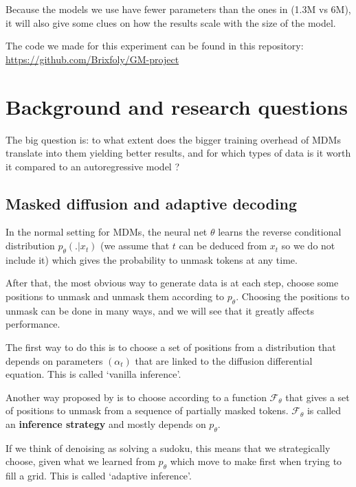 \documentclass{article}
\begin{document}
Because the models we use have fewer parameters than the ones in \citet{kim2025trainworstplanbest} (1.3M vs 6M),
it will also give some clues on how the results scale with the size of the model.

The code we made for this experiment can be found in this repository:\\
\url{https://github.com/Brixfoly/GM-project}

\section{Background and research questions}
The big question is: 
to what extent does the bigger training overhead of MDMs
translate into them yielding better results, and for which types of data is it worth it compared to an autoregressive model ?

\subsection{Masked diffusion and adaptive decoding}
In the normal setting for MDMs, the neural net $\theta$ learns the reverse conditional distribution $p_\theta(.|x_t)$ (we assume that $t$ can be deduced from $x_t$ so we do not include it) which gives the probability to unmask tokens at any time.

After that, the most obvious way to generate data is at each step, choose some positions to unmask and unmask them according to $p_\theta$. Choosing the positions to unmask can be done in many ways, and we will see that it greatly affects performance.

The first way to do this is to choose a set of positions from a distribution that depends on parameters $(\alpha_t)$ that are linked to the diffusion differential equation. This is called `vanilla inference'.

Another way proposed by \citet{kim2025trainworstplanbest} is to choose according to a function $\mathcal{F}_\theta$ that gives a set of positions to unmask from a sequence of partially masked tokens. $\mathcal{F}_\theta$ is called an \textbf{inference strategy} and mostly depends on $p_\theta$.

If we think of denoising as solving a sudoku, this means that we strategically choose, given what we learned from $p_\theta$ which
move to make first when trying to fill a grid.
This is called `adaptive inference'.
\end{document}
